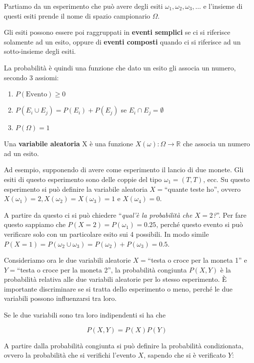 Partiamo da un esperimento che può avere degli esiti $\omega_1, \omega_2, \omega_3, \ldots$ e l'insieme di questi esiti prende il nome di spazio campionario $\Omega$.

Gli esiti possono essere poi raggruppati in \textbf{eventi semplici} se ci si riferisce solamente ad un esito, oppure di \textbf{eventi composti} quando ci si riferisce ad un sotto-insieme degli esiti. 

La probabilità è quindi una funzione che dato un esito gli associa un numero, secondo 3 assiomi:

\begin{enumerate}
	\item $P(\text{Evento}) \geq 0$
	\item $P(E_i \cup E_j) = P(E_i) + P(E_j) $ se $E_i \cap E_j = \emptyset$
	\item $P(\Omega) = 1$
\end{enumerate}

Una \textbf{variabile aleatoria} X è una funzione $X(\omega) : \Omega \rightarrow \mathbb{R}$ che associa un numero ad un esito.

Ad esempio, supponendo di avere come esperimento il lancio di due monete. Gli esiti di questo esperimento sono delle coppie del tipo $\omega_1 = (T,T)$, ecc. Su questo esperimento si può definire la variabile aleatoria $X = $``quante teste ho'', ovvero $X(\omega_1) = 2, X(\omega_2) = X(\omega_3) = 1$ e $X(\omega_4) = 0$.

A partire da questo ci si può chiedere ``\textit{qual'è la probabilità che $X = 2$?}''. Per fare questo sappiamo che $P(X = 2) = P(\omega_1) = 0.25$, perché questo evento si può verificare solo con un particolare esito sui 4 possibili.
In modo simile $P(X = 1) = P(\omega_2 \cup \omega_3) = P(\omega_2) + P(\omega_3) = 0.5$.

Consideriamo ora le due variabili aleatorie $X =$``testa o croce per la moneta 1'' e $Y =$``testa o croce per la moneta 2'', la probabilità congiunta $P(X,Y)$ è la probabilità relativa alle due variabili aleatorie per lo stesso esperimento. \`E importante discriminare se si tratta dello esperimento o meno, perché le due variabili possono influenzarsi tra loro.

Se le due variabili sono tra loro indipendenti si ha che

$$
P(X,Y) = P(X)P(Y)
$$

\noindent A partire dalla probabilità congiunta si può definire la probabilità condizionata, ovvero la probabilità che si verifichi l'evento $X$, sapendo che si è verificato $Y$:

